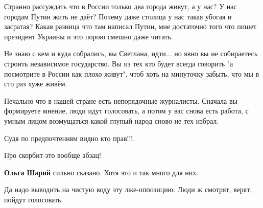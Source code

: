 \begin{itemize}
\begin{itemize}
Странно рассуждать что в России только два города живут, а у нас? У нас городам
Путин жить не даёт? Почему даже столица у нас такая убогая и засратая? Какая
разница что там написал Путин, мне достаточно того что пишет президент Украины
и это порою смешно даже читать.

Не знаю с кем и куда собрались, вы Светлана, идти... но явно вы не собираетесь
строить независимое государство. Вы из тех кто будет всегда говорить "а
посмотрите в России как плохо живут", чтоб хоть на минуточку забыть, что мы в
сто раз хуже живём.

Печально что в нашей стране есть непорядочные журналисты. Сначала вы формируете
мнение, люди идут голосовать, а потом у вас снова есть работа, с умным лицом
возмущаться какой глупый народ сново не тех избрал.

 
Судя по предпочтениям видно кто прав!!!.

 
Про скорбит-это вообще абзац!

 
\textbf{Ольга Шарий} сильно сказано. Хотя это и так много для них.

 
Да надо выводить на чистую воду эту лже-оппозицию. Люди ж смотрят, верят, пойдут голосовать.

 


\end{itemize}
\end{itemize}
